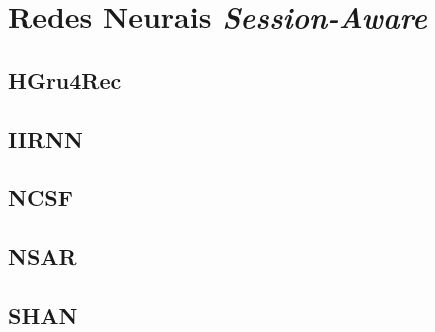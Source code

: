 \section{Redes Neurais \textit{Session-Aware}}
\subsection{HGru4Rec}
\subsection{IIRNN}
\subsection{NCSF}
\subsection{NSAR}
\subsection{SHAN}